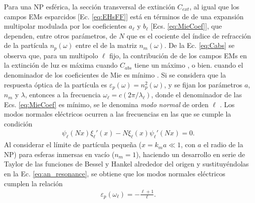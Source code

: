 Para una NP esférica, la sección transversal de extinción $C_{ext}$, al igual que los campos EMs esparcidos [Ec. \eqref{eq:EHsFF}]  está en términos de de una expansión multipolar modulada por los coeficientes $a_\ell$ y $b_\ell$ [Ecs.  \eqref{eq:MieCoef}], que dependen, entre otros parámetros, de $N$ que es el cociente del índice de refracción de la partícula $n_p(\omega)$ entre el de la matriz $n_m(\omega)$.  De la Ec.  \eqref{eq:Cabs} se observa que, para un multipolo $\ell$ fijo, la contribución de de los campos EMs en la extinción de luz es máxima  cuando $C_{abs}$ tiene un máximo \cite{maier2007plasmonics}, o bien. cuando el denominador de los coeficientes de Mie es mínimo \cite{novotny2006principles}.  Si se considera que la respuesta óptica de la partícula es 	$\varepsilon_p (\omega) = n_p^2 (\omega)$, y se fijan los parámetros $a$, $n_m$ y $\lambda$, entonces a la frecuencia $\omega_\ell = c (2\pi / \lambda_\ell)$, donde el denominador de las Ecs.  \eqref{eq:MieCoef} es mínimo, se le denomina \emph{modo normal} de orden $\ell$ \cite{bohren1998absorption,maciel2017momentum}.  Los modos normales eléctricos ocurren a las frecuencias en las que se cumple la condición 
	\begin{align}
	\psi_\ell(Nx)\xi_\ell'(x)-N\xi_\ell(x)\psi_\ell'(Nx) = 0. 
	\label{eq:an_resonance}
	\end{align}
Al considerar el límite de partícula pequeña ($x = k_m a\ll 1$, con $a$ el radio de la NP) para esferas inmersas en vacío ($n_m=1$), haciendo un desarrollo en serie de Taylor de las funciones de Bessel y Hankel alrededor del origen y sustituyéndolas en la Ec.  \eqref{eq:an_resonance}, se obtiene que los modos normales eléctricos cumplen la relación \cite{maciel2017momentum}
	\begin{align}
	\varepsilon_p(\omega_\ell) = - \frac{\ell+1}{\ell}.  
	\label{eq:NormalModes}
	\end{align}
	
